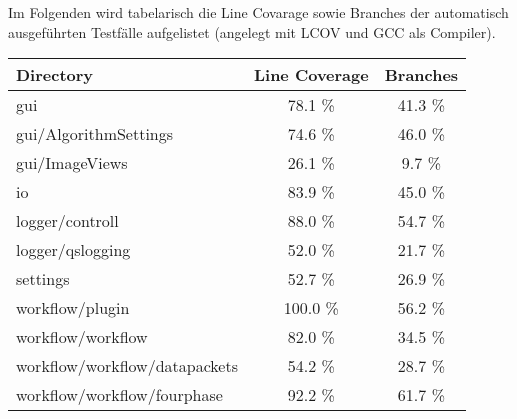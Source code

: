 Im Folgenden wird tabelarisch die Line Covarage sowie Branches der automatisch ausgeführten Testfälle aufgelistet (angelegt mit LCOV und GCC als Compiler).
\begin{center}
\begin{tabular}{|l|c|c|}
  \hline
  Directory & Line Coverage & Branches \\
  \hline
  \hline
  gui & 78.1 \%  & 41.3 \%  \\
  \hline
  gui/AlgorithmSettings & 74.6 \% & 46.0 \% \\
  \hline
  gui/ImageViews & 26.1 \% & 9.7 \% \\
  \hline
  io & 83.9 \% & 45.0 \% \\
  \hline
  logger/controll & 88.0 \% & 54.7 \% \\
  \hline
  logger/qslogging & 52.0 \% &  	21.7 \% \\
  \hline
  settings & 52.7 \% & 26.9 \% \\
  \hline
  workflow/plugin & 100.0 \% &  56.2 \% \\
  \hline
  workflow/workflow & 82.0 \% &  34.5 \% \\
  \hline
  workflow/workflow/datapackets & 54.2 \% & 28.7 \% \\
  \hline
  workflow/workflow/fourphase & 92.2 \% & 61.7 \% \\
  \hline
 \end{tabular}
 \end{center}